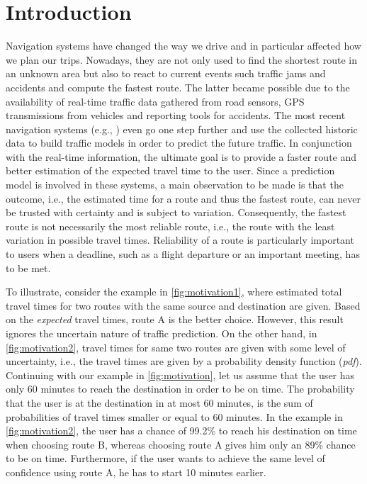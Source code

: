 \section{Introduction}

Navigation systems have changed the way we drive and in particular affected how we plan our trips. Nowadays, they are not only used to find the shortest route in an unknown area but also to react to current events such traffic jams and accidents and compute the fastest route. The latter became possible due to the availability of real-time traffic data gathered from road sensors, GPS transmissions from vehicles and reporting tools for accidents. The most recent navigation systems (e.g., \cite{Pan13}) even go one step further and use the collected historic data to build traffic models in order to predict the future traffic. In conjunction with the real-time information, the ultimate goal is to provide a faster route and better estimation of the expected travel time to the user. Since a prediction model is involved in these systems, a main observation to be made is that the outcome, i.e., the estimated time for a route and thus the fastest route, can never be trusted with certainty and is subject to variation. Consequently, the fastest route is not necessarily the most reliable route, i.e., the route with the least variation in possible travel times. Reliability of a route is particularly important to users when a deadline, such as a flight departure or an important meeting, has to be met. 

To illustrate, consider the example in \cref{fig:motivation1}, where estimated total travel times for two routes with the same source and destination are given. Based on the \textit{expected} travel times, route A is the better choice. However, this result ignores the uncertain nature of traffic prediction. On the other hand, in \cref{fig:motivation2}, travel times for same two routes are given with some level of uncertainty, i.e., the travel times are given by a probability density function (\textit{pdf}). Continuing with our example in \cref{fig:motivation}, let us assume that the user has only 60 minutes to reach the destination in order to be on time. The probability that the user is at the destination in at most 60 minutes, is the sum of probabilities of travel times smaller or equal to 60 minutes. In the example in \cref{fig:motivation2}, the user has a chance of 99.2\% to reach his destination on time when choosing route B, whereas choosing route A gives him only an 89\% chance to be on time. Furthermore, if the user wants to achieve the same level of confidence using route A, he has to start 10 minutes earlier.

